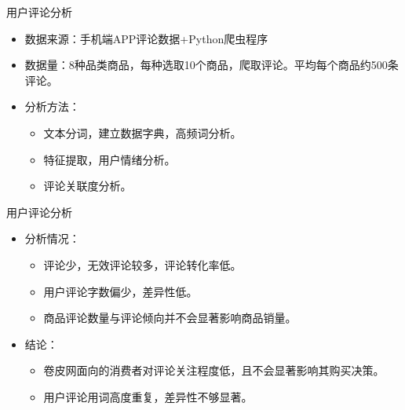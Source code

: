 \documentclass[10pt,aspectratio=32,handout]{beamer}
\begin{document}
\begin{frame}{用户评论分析}
  \begin{itemize}
    \item 数据来源：手机端APP评论数据+Python爬虫程序\newline
    \item 数据量：8种品类商品，每种选取10个商品，爬取评论。平均每个商品约500条评论。\newline
    \item 分析方法：\newline
    \begin{itemize}
    \item 文本分词，建立数据字典，高频词分析。\newline
    \item 特征提取，用户情绪分析。\newline
    \item 评论关联度分析。\newline
    \end{itemize}
  \end{itemize}
\end{frame}


\begin{frame}{用户评论分析}
\begin{itemize}
\item 分析情况：\newline
  \begin{itemize}
    \item 评论少，无效评论较多，评论转化率低。\newline
    \item 用户评论字数偏少，差异性低。\newline
    \item 商品评论数量与评论倾向并不会显著影响商品销量。\newline
  \end{itemize}
\item 结论：\newline
  \begin{itemize}
    \item 卷皮网面向的消费者对评论关注程度低，且不会显著影响其购买决策。\newline
    \item 用户评论用词高度重复，差异性不够显著。\newline
  \end{itemize}
\end{itemize}
\end{frame}
\end{document}
